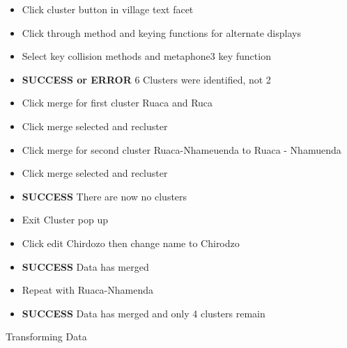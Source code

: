 \documentclass{article}
\begin{document}
\begin{itemize}
\item Click cluster button in village text facet
\item Click through method and keying functions for alternate displays
\item Select key collision methods and metaphone3 key function
\item \textbf{SUCCESS or ERROR} 6 Clusters were identified, not 2
\item Click merge for first cluster Ruaca and Ruca
\item Click merge selected and recluster
\item Click merge for second cluster Ruaca-Nhameuenda to Ruaca - Nhamuenda
\item Click merge selected and recluster
\item \textbf{SUCCESS} There are now no clusters
\item Exit Cluster pop up
\item Click edit Chirdozo then change name to Chirodzo
\item \textbf{SUCCESS} Data has merged
\item Repeat with Ruaca-Nhamenda
\item \textbf{SUCCESS} Data has merged and only 4 clusters remain
\end{itemize}
Transforming Data
\end{document}
